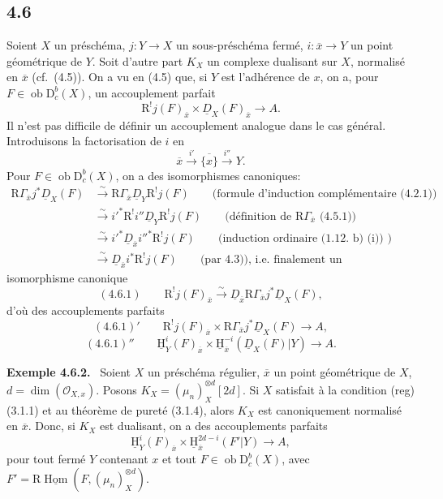 \documentclass[11pt]{article}
\providecommand{\cO}{\mathcal{O}}
\providecommand{\uH}{\underline{\mathrm H}}
\newenvironment{statement}[1]{\par\medskip\noindent\textbf{#1.}\ }{\par\medskip}
\DeclareMathOperator{\Hom}{Hom}
\newcommand{\R}{\mathrm{R}}\newcommand{\RHomCore}{\mathrm{RHom}}
\newcommand{\D}{\mathrm{D}}
\newcommand{\ob}{\operatorname{ob}}
\newcommand{\ol}[1]{\overline{#1}}
\providecommand{\Hom}{\operatorname{Hom}}
\providecommand{\ob}{\operatorname{ob}}
\providecommand{\R}{\mathrm R}
\providecommand{\Hom}{\operatorname{Hom}}
\begin{document}
\subsection*{4.6}
Soient $X$ un préschéma, $j:Y\to X$ un sous-préschéma fermé, $i:\ol{x}\to Y$ un point géométrique de $Y$. Soit d'autre part $K_X$ un complexe dualisant sur $X$, normalisé en $\ol{x}$ (cf.~(4.5)). On a vu en (4.5) que, si $Y$ est l'adhérence de $x$, on a, pour $F\in\ob\D_c^b(X)$, un accouplement parfait
\[
\R^{!}j(F)_{\ol{x}}\times \underline{D}_X(F)_{\ol{x}}\longrightarrow A.
\]
Il n'est pas difficile de définir un accouplement analogue dans le cas général. Introduisons la factorisation de $i$ en
\[
\ol{x}\xrightarrow{i'}\ol{\{x\}}\xrightarrow{i''}Y.
\]
Pour $F\in\ob\D_c^b(X)$, on a des isomorphismes canoniques:
\[
\begin{aligned}
\R\Gamma_{\ol{x}}j^*\underline{D}_X(F)&\xrightarrow{\sim}\R\Gamma_{\ol{x}}\underline{D}_Y\R^{!}j(F)\qquad\text{(formule d'induction complémentaire (4.2.1))}\\
&\xrightarrow{\sim}i'^*\R^{!}i''\underline{D}_Y\R^{!}j(F)\qquad\text{(définition de $\R\Gamma_{\ol{x}}$ (4.5.1))}\\
&\xrightarrow{\sim}i'^*\underline{D}_{\ol{x}}i''^*\R^{!}j(F)\qquad\text{(induction ordinaire (1.12. b) (i)) )}\\
&\xrightarrow{\sim}\underline{D}_{\ol{x}}i^*\R^{!}j(F)\qquad\text{(par 4.3)), i.e. finalement un}
\end{aligned}
\]
isomorphisme canonique
\[
(4.6.1)\qquad \R^{!}j(F)_{\ol{x}}\xrightarrow{\sim}\underline{D}_{\ol{x}}\R\Gamma_{\ol{x}}j^*\underline{D}_X(F),
\]
d'où des accouplements parfaits
\[
(4.6.1)'\qquad \R^{!}j(F)_{\ol{x}}\times \R\Gamma_{\ol{x}}j^*\underline{D}_X(F)\longrightarrow A,
\]
\[
(4.6.1)''\qquad \uH_Y^i(F)_{\ol{x}}\times \uH_{\ol{x}}^{-i}(\underline{D}_X(F)|Y)\longrightarrow A.
\]

\begin{statement}{Exemple 4.6.2}
Soient $X$ un préschéma régulier, $\ol{x}$ un point géométrique de $X$, $d=\dim(\cO_{X,x})$. Posons $K_X=(\mu_n)_X^{\otimes d}[2d]$. Si $X$ satisfait à la condition (reg) (3.1.1) et au théorème de pureté (3.1.4), alors $K_X$ est canoniquement normalisé en $\ol{x}$. Donc, si $K_X$ est dualisant, on a des accouplements parfaits
\[
\uH_Y^i(F)_{\ol{x}}\times \uH_{\ol{x}}^{2d-i}(F'|Y)\longrightarrow A,
\]
pour tout fermé $Y$ contenant $x$ et tout $F\in\ob\D_c^b(X)$, avec $F'=\R\underline{\Hom}(F,(\mu_n)_X^{\otimes d})$.
\end{statement}
\end{document}
